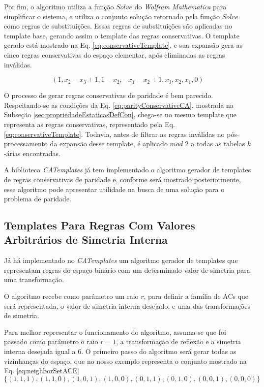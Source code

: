 Por fim, o algoritmo utiliza a função $Solve$ do \textit{Wolfram Mathematica} para simplificar o sistema, e utiliza o conjunto solução retornado pela função $Solve$ como regras de substituições. Essas regras de substituições são aplicadas no template base, gerando assim o template das regras conservativas. O template gerado está mostrado na Eq. \eqref{eq:conservativeTemplate}, e sua expansão gera as cinco regras conservativas do espaço elementar, após eliminadas as regras inválidas.

\begin{equation}
(1,x_2-x_3+1,1-x_2,-x_1-x_2+1,x_3,x_2,x_1,0)
\label{eq:conservativeTemplate}
\end{equation}

O processo de gerar regras conservativas de paridade é bem parecido. Respeitando-se as condições da Eq. \eqref{eq:parityConservativeCA}, mostrada na Subseção \ref{sec:propriedadeEstaticasDefCon}, chega-se no mesmo template que representa as regras conservativas, representado pela Eq. \eqref{eq:conservativeTemplate}. Todavia, antes de filtrar as regras inválidas no pós-processamento da expansão desse template, é aplicado $mod$ $2$ a todas as tabelas $k$-árias encontradas.

A biblioteca \textit{CATemplates} já tem implementado o algoritmo gerador de templates de regras conservativas de paridade e, conforme será mostrado posteriormente, esse algoritmo pode apresentar utilidade na busca de uma solução para o problema de paridade.

\subsection{Templates Para Regras Com Valores Arbitrários de Simetria Interna}
Já há implementado no \textit{CATemplates} um algoritmo gerador de templates que representam regras do espaço binário com um determinado valor de simetria para uma transformação.

O algoritmo recebe como parâmetro um raio $r$, para definir a família de ACs que será representada, o valor de simetria interna desejado, e uma das transformações de simetria.

Para melhor representar o funcionamento do algoritmo, assuma-se que foi passado como parâmetro o raio $r = 1$, a transformação de reflexão e a simetria interna desejada igual a 6. O primeiro passo do algoritmo será gerar todas as vizinhanças do espaço, que no nosso exemplo representa o conjunto mostrado na Eq. \eqref{eq:neighborSetACE}
\begin{equation}
\{(1,1,1),(1,1,0),
(1,0,1),(1,0,0),
(0,1,1),(0,1,0),
(0,0,1),(0,0,0)\}
\label{eq:neighborSetACE}
\end{equation}

